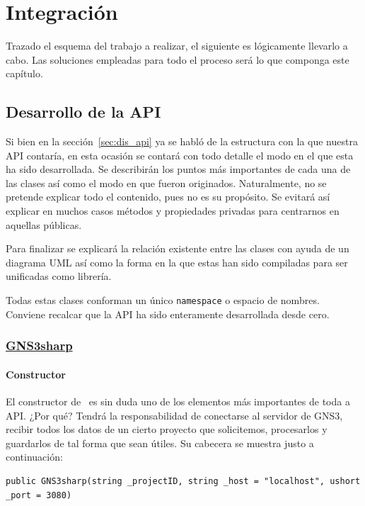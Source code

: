\chapter{Integración}\label{chap:Integration}
Trazado el esquema del trabajo a realizar, el siguiente es lógicamente llevarlo a cabo. Las soluciones empleadas para todo el proceso será lo que componga este capítulo.

\section{Desarrollo de la API}
Si bien en la sección~\ref{sec:dis_api} ya se habló de la estructura con la que nuestra API contaría, en esta ocasión se contará con todo detalle el modo en el que esta ha sido desarrollada. Se describirán los puntos más importantes de cada una de las clases así como el modo en que fueron originados. Naturalmente, no se pretende explicar todo el contenido, pues no es su propósito. Se evitará así explicar en muchos casos métodos y propiedades privadas para centrarnos en aquellas públicas.

Para finalizar se explicará la relación existente entre las clases con ayuda de un diagrama UML así como la forma en la que estas han sido compiladas para ser unificadas como librería.

Todas estas clases conforman un único \texttt{namespace} o espacio de nombres. Conviene recalcar que la API ha sido enteramente desarrollada desde cero.

\subsection[GNS3sharp]{\href{https://github.com/aorestr/GNS3sharp/blob/master/gsn3sharp.cs}{GNS3sharp}}
\subsubsection{Constructor}
El constructor de \GNSCS~es sin duda uno de los elementos más importantes de toda a API. ¿Por qué? Tendrá la responsabilidad de conectarse al servidor de GNS3, recibir todos los datos de un cierto proyecto que solicitemos, procesarlos y guardarlos de tal forma que sean útiles. Su cabecera se muestra justo a continuación:
\begin{lstlisting}[language={[Sharp]C}, caption={Cabecera del constructor de \texttt{GNS3sharp}}, label={gnscs1}]
public GNS3sharp(string _projectID, string _host = "localhost", ushort _port = 3080)
\end{lstlisting}

